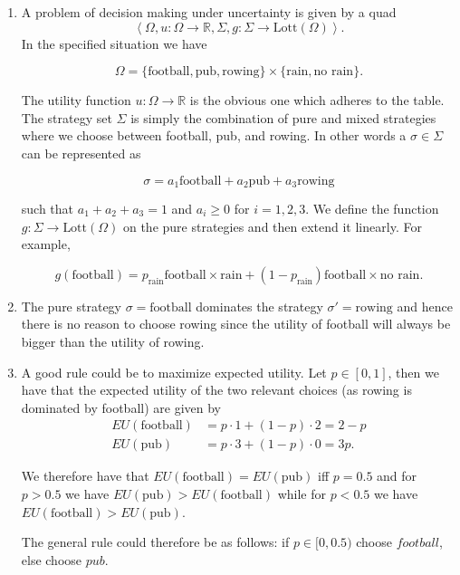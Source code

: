 \documentclass[a4paper]{article}
\begin{document}
  \begin{exercise}{3}
    \begin{enumerate}[label=(\alph*)]
      \item A problem of decision making under uncertainty is given by a quad
        \begin{equation*}
          \left\langle \Omega,u: \Omega \to \mathbb{R}, \Sigma, g: \Sigma \to \text{Lott}(\Omega) \right\rangle
        .\end{equation*}
        In the specified situation we have

        $$ \Omega = \{\text{football}, \text{pub}, \text{rowing}\} \times \{\text{rain}, \text{no rain}\}. $$

        The utility function
        $ u: \Omega \to \mathbb{R} $ is the obvious one which adheres to the table. The strategy set $ \Sigma $ is simply the combination of pure and mixed strategies where we choose between football, pub, and rowing. In other words a $ \sigma \in \Sigma $ can be represented as

        $$ \sigma = a_1\text{football} + a_2\text{pub} + a_3\text{rowing} $$

        such that $ a_1 + a_2 + a_3 = 1 $ and $ a_i \geq 0 $ for $ i = 1,2,3 $. We define the function $ g: \Sigma \to \text{Lott}(\Omega) $ on the pure strategies and then extend it linearly. For example,

        $$ g(\text{football}) = p_\text{rain}\text{football}\times\text{rain} + (1-p_\text{rain})\text{football}\times\text{no rain}.
        $$

      \item The pure strategy $ \sigma = \text{football} $ dominates the strategy $ \sigma'=\text{rowing} $ and hence there is no reason to choose rowing since the utility of football will always be bigger than the utility of rowing.

      \item A good rule could be to maximize expected utility. Let $ p \in [0, 1] $, then we have that the expected utility of the two relevant choices (as rowing is dominated by football) are given by
        \begin{align*}
          EU(\text{football}) &= p\cdot 1 + (1-p) \cdot 2 = 2 - p \\
          EU(\text{pub}) &= p\cdot 3 + (1-p)\cdot 0 = 3p
        .\end{align*}

        We therefore have that $ EU(\text{football})=EU(\text{pub}) $ iff $ p = 0.5 $ and for $ p > 0.5 $ we have $ EU(\text{pub}) > EU(\text{football}) $ while for $ p < 0.5 $ we have $ EU(\text{football}) > EU(\text{pub}) $.

        The general rule could therefore be as follows: if $ p \in [0, 0.5) $ choose $ football $, else choose $ pub $.
    \end{enumerate}
  \end{exercise}
\end{document}

